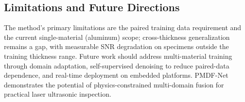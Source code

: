 \subsection{Limitations and Future Directions}
\label{sec:conclusion-limitations}

The method's primary limitations are the paired training data requirement and the current single-material (aluminum) scope; cross-thickness generalization remains a gap, with measurable SNR degradation on specimens outside the training thickness range. Future work should address multi-material training through domain adaptation, self-supervised denoising to reduce paired-data dependence, and real-time deployment on embedded platforms. PMDF-Net demonstrates the potential of physics-constrained multi-domain fusion for practical laser ultrasonic inspection.
